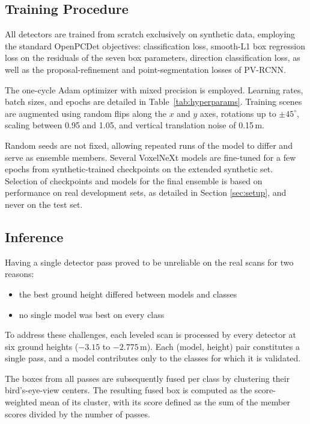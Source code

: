 \documentclass[conference]{IEEEtran}
\begin{document}
\subsection{Training Procedure}

All detectors are trained from scratch exclusively on synthetic data, employing the standard OpenPCDet objectives: classification loss, smooth-L1 box regression loss on the residuals of the seven box parameters, direction classification loss, as well as the proposal-refinement and point-segmentation losses of PV-RCNN.

The one-cycle Adam optimizer with mixed precision is employed. Learning rates, batch sizes, and epochs are detailed in Table~\ref{tab:hyperparams}. Training scenes are augmented using random flips along the $x$ and $y$ axes, rotations up to $\pm 45^\circ$, scaling between 0.95 and 1.05, and vertical translation noise of 0.15\,m.

Random seeds are not fixed, allowing repeated runs of the model to differ and serve as ensemble members. Several VoxelNeXt models are fine-tuned for a few epochs from synthetic-trained checkpoints on the extended synthetic set. Selection of checkpoints and models for the final ensemble is based on performance on real development sets, as detailed in Section \ref{sec:setup}, and never on the test set.

\subsection{Inference}\label{sec:inference}

Having a single detector pass proved to be unreliable on the real scans for two reasons:

\begin{itemize}
    \item the best ground height differed between models and classes
    \item no single model was best on every class
\end{itemize}

To address these challenges, each leveled scan is processed by every detector at six ground heights ($-3.15$ to $-2.775$\,m). Each (model, height) pair constitutes a single pass, and a model contributes only to the classes for which it is validated.

The boxes from all passes are subsequently fused per class by clustering their bird's-eye-view centers. The resulting fused box is computed as the score-weighted mean of its cluster, with its score defined as the sum of the member scores divided by the number of passes.
\end{document}

